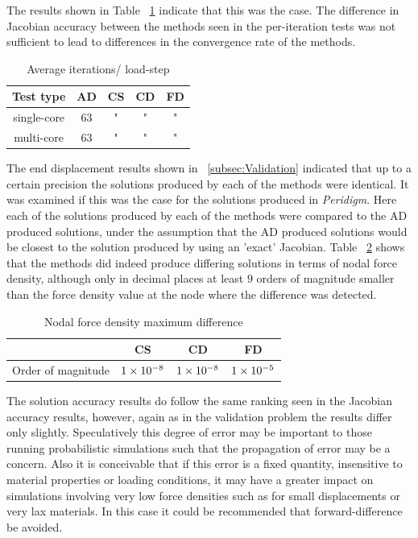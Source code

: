\documentclass[preprint,12pt]{elsarticle}
\begin{document}
The results shown in Table ~\ref{tab:ConvergenceStudy2} indicate that this was the case. 
The difference in Jacobian accuracy between the methods seen in the per-iteration tests
was not sufficient to lead to differences in the convergence rate of the methods.

\begin{table}[!ht]   
    \centering \caption{Average iterations/ load-step} 
    \label{tab:ConvergenceStudy2}   
    \begin{tabular}{c c c c c}
    \toprule Test type & AD & CS & CD & FD\\
        \midrule 
        single-core & 63 & " & " & "\\ 
        multi-core  & 63 & " & " & "\\ 
\bottomrule \end{tabular} \end{table}

The end displacement results shown in ~\ref{subsec:Validation} indicated that up to a certain precision the
solutions produced by each of the methods were identical. It was examined if this was the case for the 
solutions produced in \emph{Peridigm}. Here each of the solutions produced by each of the 
methods were compared to the AD produced solutions, under the assumption that the AD produced solutions
would be closest to the solution produced by using an 'exact' Jacobian. Table ~\ref{tab:PeridigmSolutionAccuracy} shows that the methods
did indeed produce differing solutions in terms of nodal force density, although only in decimal places at least $9$ orders 
of magnitude smaller than the force density value at the node where the difference was detected.

\begin{table}[!ht]   
    \centering \caption{Nodal force density maximum difference} 
    \label{tab:PeridigmSolutionAccuracy}   
    \begin{tabular}{c c c c}
    \toprule  & CS & CD & FD\\
        \midrule  Order of magnitude & $\num{1.E-8}$ & $\num{1.E-8}$ & $\num{1.E-5}$ \\ 
\bottomrule \end{tabular} \end{table}

The solution accuracy results do follow the same ranking seen in the Jacobian accuracy results, however,
again as in the validation problem the results differ only slightly. Speculatively this degree of error
may be important to those running probabilistic simulations such that the propagation of error may be 
a concern. Also it is conceivable that if this error is a fixed quantity, insensitive to material 
properties or loading conditions, it may have a greater impact on simulations involving very low
force densities such as for small displacements or very lax materials. In this case it could be recommended
that forward-difference be avoided. 
\end{document}
